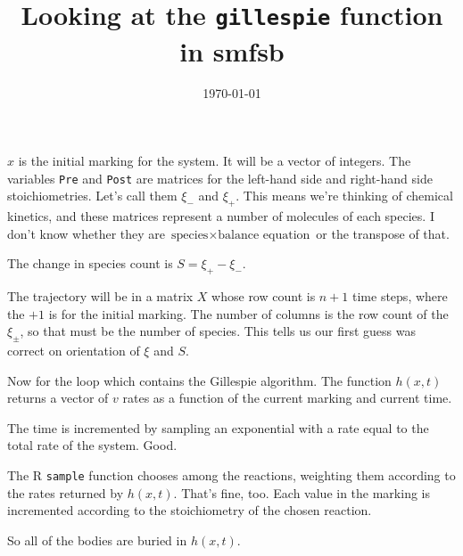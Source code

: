 \documentclass{article}
\title{Looking at the \texttt{gillespie} function in smfsb}
\date{\today}
\begin{document}
\maketitle

$x$ is the initial marking for the system. It will be a vector
of integers.
The variables \texttt{Pre} and \texttt{Post} are matrices for
the left-hand side and right-hand side stoichiometries.
Let's call them $\xi_{-}$ and $\xi_{+}$. This
means we're thinking of chemical kinetics, and these matrices
represent a number of molecules of each species. I don't know
whether they are $\mbox{species}\times\mbox{balance equation}$
or the transpose of that.

The change in species count is $S=\xi_{+}-\xi_{-}$.

The trajectory will be in a matrix $X$ whose row count
is $n+1$ time steps, where the $+1$ is for the initial marking.
The number of columns is the row count of the $\xi_{\pm}$,
so that must be the number of species. This tells us our first
guess was correct on orientation of $\xi$ and $S$.

Now for the loop which contains the Gillespie algorithm.
The function $h(x, t)$ returns a vector of $v$ rates
as a function of the current marking and current time.

The time is incremented by sampling an exponential with
a rate equal to the total rate of the system. Good.

The R \texttt{sample} function chooses among
the reactions, weighting them according
to the rates returned by $h(x,t)$. That's fine, too.
Each value in the marking is incremented according
to the stoichiometry of the chosen reaction.

So all of the bodies are buried in $h(x,t)$.
\end{document}
